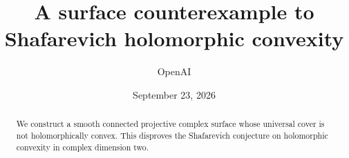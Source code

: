 \documentclass[11pt]{article}
\title{A surface counterexample to Shafarevich holomorphic convexity}
\author{OpenAI}
\date{September 23, 2026}
\theoremstyle{definition}
\theoremstyle{remark}
\begin{document}
\maketitle
\begin{abstract}
We construct a smooth connected projective complex surface whose universal
cover is not holomorphically convex. This disproves the Shafarevich
conjecture on holomorphic convexity in complex dimension two.
\end{abstract}
\tableofcontents
\clearpage








\end{document}
